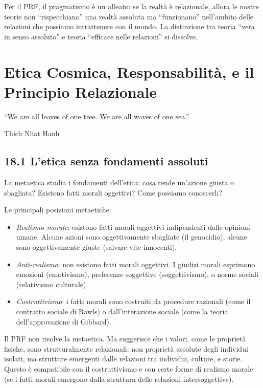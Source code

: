 \documentclass[11.5pt,a4paper,openany]{book}
\theoremstyle{remark}
\begin{document}
Per il PRF, il pragmatismo è un alleato: se la realtà è relazionale, allora le nostre teorie non ``rispecchiano'' una realtà assoluta ma ``funzionano'' nell'ambito delle relazioni che possiamo intrattenere con il mondo. La distinzione tra teoria ``vera in senso assoluto'' e teoria ``efficace nelle relazioni'' si dissolve.

\chapter{Etica Cosmica, Responsabilità, e il Principio Relazionale}

\epigraph{``We are all leaves of one tree. We are all waves of one sea.''}{Thich Nhat Hanh}

\section{18.1 L'etica senza fondamenti assoluti}

La metaetica studia i fondamenti dell'etica: cosa rende un'azione giusta o sbagliata? Esistono fatti morali oggettivi? Come possiamo conoscerli?

Le principali posizioni metaetiche:
\begin{itemize}
\item \textit{Realismo morale}: esistono fatti morali oggettivi indipendenti dalle opinioni umane. Alcune azioni sono oggettivamente sbagliate (il genocidio), alcune sono oggettivamente giuste (salvare vite innocenti).
\item \textit{Anti-realismo}: non esistono fatti morali oggettivi. I giudizi morali esprimono emozioni (emotivismo), preferenze soggettive (soggettivismo), o norme sociali (relativismo culturale).
\item \textit{Costruttivismo}: i fatti morali sono costruiti da procedure razionali (come il contratto sociale di Rawls) o dall'interazione sociale (come la teoria dell'approvazione di Gibbard).
\end{itemize}

Il PRF non risolve la metaetica. Ma suggerisce che i valori, come le proprietà fisiche, sono strutturalmente relazionali: non proprietà assolute degli individui isolati, ma strutture emergenti dalle relazioni tra individui, culture, e storie. Questo è compatibile con il costruttivismo e con certe forme di realismo morale (se i fatti morali emergono dalla struttura delle relazioni intersoggettive).
\end{document}
